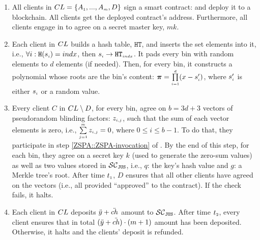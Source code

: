 \begin{enumerate}


\item\label{gen-FPSI-cont} All clients in ${CL}=\{ A_{\scriptscriptstyle 1},...,   A_{\scriptscriptstyle m},  D\}$ sign a smart contract: \scf and deploy it to a blockchain. All clients get the deployed contract's address. Furthermore, all clients engage in \ct to agree on a secret master key, $mk$.

\item \label{encode-encrypt} Each client in ${CL}$  builds a  hash table,  $\mathtt{HT}$, and inserts the set elements into  it, i.e.,  $\forall i: \mathtt{H}( s_{\scriptscriptstyle i})={indx}$, then $ s_{\scriptscriptstyle i}\rightarrow \mathtt{HT}_{\scriptscriptstyle indx}$. It pads every bin with random elements to $d$ elements (if needed). Then,  for every bin, it constructs a polynomial whose roots are the bin's content: $\bm\pi=\prod\limits^{\scriptscriptstyle d}_{\scriptscriptstyle i=1} (x-s'_{\scriptscriptstyle i})$, where $s'_{\scriptscriptstyle i}$ is either $s_{\scriptscriptstyle i}$ or a random value. 
%
\item \label{ZSPA} Every client $ C$ in ${CL}\setminus D$, for every bin, agree on $b=3d+3$ vectors of pseudorandom blinding factors: $z_{\scriptscriptstyle i,j}$, such that the sum of each vector elements is zero, i.e., $\sum\limits^{\scriptscriptstyle m}_{\scriptscriptstyle j=1}z_{\scriptscriptstyle i,j}=0$, where $0\leq i\leq b-1$. To do that, they participate in step \ref{ZSPA::ZSPA-invocation} of \zspaa. By the end of this step, for each bin, they agree on a secret key $k$ (used to generate the zero-sum values) as well as two values stored in $\mathcal{SC}_{\mathtt{JUS}}$, i.e., $q$: the key's hash value and $g$: a Merkle tree's root. After time $t_{\scriptscriptstyle 1}$,  $D$ ensures that all other clients have agreed on the vectors (i.e., all provided ``approved''  to the contract). If the check fails, it halts. 
%
\item\label{F-PSI::each-client-deposit} Each client in ${CL}$ deposits $\ddot{y}+\ddot{ch}$ amount to $\mathcal{SC}_{\mathtt{JUS}}$. After time $t_{\scriptscriptstyle 2}$, every client ensures that in total $(\ddot{y}+\ddot{ch})\cdot (m+1)$ amount has been deposited. Otherwise, it halts and the clients' deposit is refunded. 








\end{enumerate}
